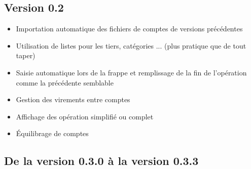 \subsection{Version 0.2}

\begin{itemize}
	\item Importation automatique des fichiers de comptes de versions précédentes
	\item Utilisation de listes pour les tiers, catégories ... (plus pratique que de tout taper)
	\item Saisie automatique lors de la frappe et remplissage de la fin de l'opération comme la précédente semblable
	\item Gestion des virements entre comptes
	\item Affichage des opération simplifié ou complet
	\item Équilibrage de comptes
\end{itemize}

\subsection{De la version 0.3.0 à la version 0.3.3}


